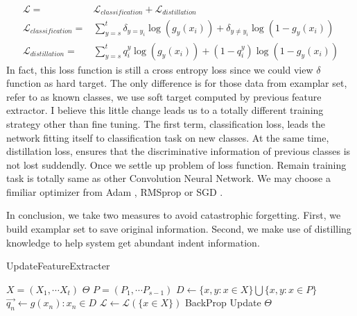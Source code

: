 \documentclass[12pt]{report}
\begin{document}
\begin{equation}
    \begin{split}
        \mathcal{L} =& \mathcal{L}_{classification} + \mathcal{L}_{distillation} \\
        \mathcal{L}_{classification} =& \sum_{y = s}^{t} \delta_{y = y_{i}} \log \left( g_{y}\left(x_{i}\right) \right) + \delta_{y \ne y_{i}} \log \left( 1 - g_{y}\left(x_{i}\right) \right) \\
        \mathcal{L}_{distillation} =& \sum_{y = s}^{t} q_{i}^{y} \log \left( g_{y}\left(x_{i}\right) \right) + \left( 1 - q_{i}^{y}\right) \log \left( 1 - g_{y}\left(x_{i} \right) \right)
    \end{split}
\end{equation}
In fact, this loss function is still a cross entropy \cite{entropy} loss since we could view $\delta$ function as hard target. The only difference is for those data from examplar set, refer to as known classes, we use soft target computed by previous feature extractor. I believe this little change leads us to a totally different training strategy other than fine tuning. The first term, classification loss, leads the network fitting itself to classification task on new classes. At the same time, distillation loss, ensures that the discriminative information of previous classes is not lost suddendly. Once we settle up problem of loss function. Remain training task is totally same as other Convolution Neural Network. We may choose a fimiliar optimizer from Adam \cite{adam}, RMSprop \cite{rms} or SGD \cite{sgd}.
\par In conclusion, we take two measures to avoid catastrophic forgetting. First, we build examplar set to save original information. Second, we make use of distilling knowledge to help system get abundant indent information.  
\begin{algorithm}
	\caption{UpdateFeatureExtracter}
    \begin{algorithmic}[1]
        \REQUIRE $X = \left( X_{1},\cdots X_{t} \right)$
        \REQUIRE $\Theta$
        \REQUIRE $P = \left(P_{1},\cdots P_{s-1} \right)$
        \STATE $D \leftarrow \{ x,y: x \in X \} \bigcup \{ x,y : x \in P \} $
        \STATE $\vec{q_{n}} \leftarrow g \left(x_{n} \right): x_{n} \in D$ 
        \ENDFOR
        \STATE $\mathcal{L} \leftarrow \mathcal{L} \left( \{x \in X\}\right)$
        \STATE BackProp
        \STATE Update $\Theta$
	\end{algorithmic}
\end{algorithm}
\end{document}
